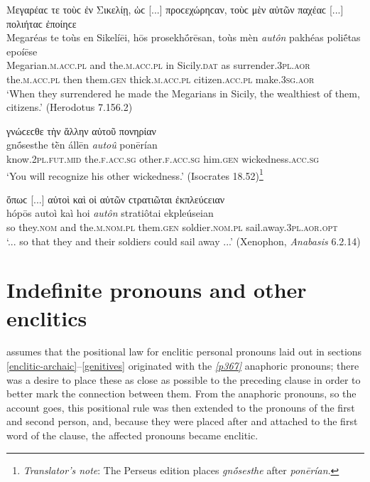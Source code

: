 \begin{exe}
\ex Μεγαρέαϲ τε τοὺϲ ἐν Σικελίῃ, ὡϲ {[}...{]} προϲεχώρηϲαν, τοὺϲ μὲν αὐτῶν παχέαϲ {[}...{]} πολιήταϲ ἐποίηϲε\\
\gll Megaréas te toùs en Sikelíēi, hōs prosekhṓrēsan, toùs mèn \emph{autôn} pakhéas poliḗtas epoíēse\\
Megarian.\textsc{m.acc.pl} and the.\textsc{m.acc.pl} in Sicily.\textsc{dat} as surrender.\textsc{3pl.aor} the.\textsc{m.acc.pl} then them.\textsc{gen} thick.\textsc{m.acc.pl} citizen.\textsc{acc.pl} make.\textsc{3sg.aor}\\
\trans `When they surrendered he made the Megarians in Sicily, the wealthiest of them, citizens.' (Herodotus 7.156.2)
\label{autos8}
\end{exe}

\begin{exe}
\ex γνώϲεϲθε τὴν ἄλλην αὐτοῦ πονηρίαν\\
\gll gnṓsesthe tḕn állēn \emph{autoû} ponērían\\
know.\textsc{2pl.fut.mid} the.\textsc{f.acc.sg} other.\textsc{f.acc.sg} him.\textsc{gen} wickedness.\textsc{acc.sg}\\
\trans `You will recognize his other wickedness.' (Isocrates 18.52)\footnote{\emph{Translator's note}: The Perseus edition places \textit{gnṓsesthe} after \textit{ponērían}.}
\label{autos9}
\end{exe}

\begin{exe}
\ex ὅπωϲ {[}...{]} αὐτοὶ καὶ οἱ αὐτῶν ϲτρατιῶται ἐκπλεύϲειαν\\
\gll hópōs autoì kaì hoi \emph{autôn} stratiôtai ekpleúseian\\
so they.\textsc{nom} and the.\textsc{m.nom.pl} them.\textsc{gen} soldier.\textsc{nom.pl} sail.away.\textsc{3pl.aor.opt}\\
\trans `... so that they and their soldiers could sail away ...' (Xenophon, \textit{Anabasis} 6.2.14)
\label{autos10}
\end{exe}


\section{Indefinite pronouns and other enclitics}

\citet[177--178]{Bergaigne1877} assumes that the positional law for enclitic personal pronouns laid out in sections \ref{enclitic-archaic}--\ref{genitives} originated with the \hyperlink{p367}{\emph{[p367]}} anaphoric pronouns; there was a desire to place these as close as possible to the preceding clause in order to better mark the connection between them. From the anaphoric pronouns, so the account goes, this positional rule was then extended to the pronouns of the first and second person, and, because they were placed after and attached to the first word of the clause, the affected pronouns became enclitic.

